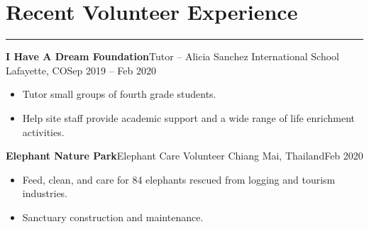 \documentclass[letterpaper,10pt]{article}
\newcommand{\mblue}{\color{darkblue}}
\begin{document}
\section*{\mblue Recent Volunteer Experience}

\vspace{-2.15pc}
{\hfill\mblue\rule{4.17in}{0.02cm}}

\vspace{1pc}
\textbf{I Have A Dream Foundation}\hfill Tutor -- Alicia Sanchez International School
\smallbreak Lafayette, CO\hfill Sep 2019 -- Feb 2020

\begin{itemize}
    \item Tutor small groups of fourth grade students.
    \item Help site staff provide academic support and a wide range of life enrichment activities.
\end{itemize}

\vspace{1pc}
\textbf{Elephant Nature Park}\hfill Elephant Care Volunteer
\smallbreak Chiang Mai, Thailand\hfill Feb 2020

\begin{itemize}
    \item Feed, clean, and care for 84 elephants rescued from logging and tourism industries.
    \item Sanctuary construction and maintenance.
\end{itemize}
\end{document}
